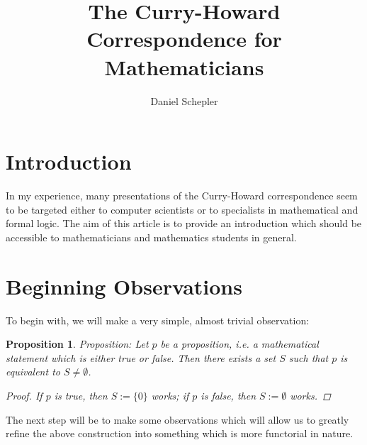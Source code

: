 \documentclass{article}
\newtheorem{proposition}{Proposition}
\theoremstyle{definition}
\begin{document}
	\title{The Curry-Howard Correspondence for Mathematicians}
	\author{Daniel Schepler}
	
	\maketitle
	
	\section{Introduction}
	In my experience, many presentations of the Curry-Howard correspondence seem to be targeted either to computer scientists or to specialists in mathematical and formal logic.  The aim of this article is to provide an introduction which should be accessible to mathematicians and mathematics students in general.
	
	\section{Beginning Observations}
	To begin with, we will make a very simple, almost trivial observation:

	\begin{proposition}
	Proposition: Let $p$ be a proposition, i.e. a mathematical statement which is either true or false.  Then there exists a set $S$ such that $p$ is equivalent to $S \ne \emptyset$.
	
	\begin{proof}If $p$ is true, then $S := \{ 0 \}$ works; if $p$ is false, then $S := \emptyset$ works.
		\end{proof}
	\end{proposition}	
	
	The next step will be to make some observations which will allow us to greatly refine the above construction into something which is more functorial in nature.
	
\end{document}
